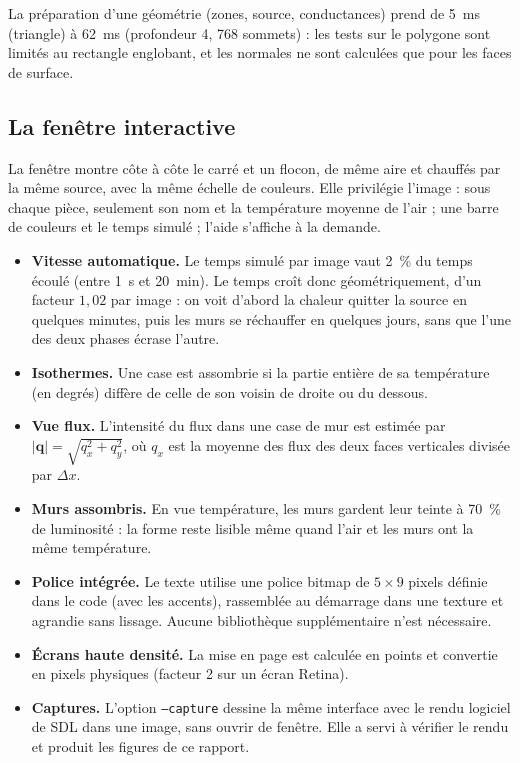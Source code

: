 \documentclass[11pt,a4paper]{article}
\theoremstyle{definition}
\theoremstyle{remark}
\newcommand{\dx}{\Delta x}
\begin{document}
La préparation d'une géométrie (zones, source, conductances) prend de
\qty{5}{\milli\second} (triangle) à \qty{62}{\milli\second} (profondeur 4, 768
sommets) : les tests sur le polygone sont limités au rectangle englobant, et les
normales ne sont calculées que pour les faces de surface.

\subsection{La fenêtre interactive}

La fenêtre montre côte à côte le carré et un flocon, de même aire et chauffés par
la même source, avec la même échelle de couleurs. Elle privilégie l'image : sous
chaque pièce, seulement son nom et la température moyenne de l'air ; une barre de
couleurs et le temps simulé ; l'aide s'affiche à la demande.

\begin{itemize}
  \item \textbf{Vitesse automatique.} Le temps simulé par image vaut \qty{2}{\percent}
  du temps écoulé (entre \qty{1}{\second} et \qty{20}{\minute}). Le temps croît donc
  géométriquement, d'un facteur $1,02$ par image : on voit d'abord la chaleur quitter
  la source en quelques minutes, puis les murs se réchauffer en quelques jours, sans
  que l'une des deux phases écrase l'autre.
  \item \textbf{Isothermes.} Une case est assombrie si la partie entière de sa
  température (en degrés) diffère de celle de son voisin de droite ou du dessous.
  \item \textbf{Vue flux.} L'intensité du flux dans une case de mur est estimée par
  $|\mathbf{q}| = \sqrt{q_x^2+q_y^2}$, où $q_x$ est la moyenne des flux des deux faces
  verticales divisée par $\dx$.
  \item \textbf{Murs assombris.} En vue température, les murs gardent leur teinte à
  \qty{70}{\percent} de luminosité : la forme reste lisible même quand l'air et les
  murs ont la même température.
  \item \textbf{Police intégrée.} Le texte utilise une police bitmap de $5\times9$
  pixels définie dans le code (avec les accents), rassemblée au démarrage dans une
  texture et agrandie sans lissage. Aucune bibliothèque supplémentaire n'est
  nécessaire.
  \item \textbf{Écrans haute densité.} La mise en page est calculée en points et
  convertie en pixels physiques (facteur 2 sur un écran Retina).
  \item \textbf{Captures.} L'option \texttt{--capture} dessine la même interface avec
  le rendu logiciel de SDL dans une image, sans ouvrir de fenêtre. Elle a servi à
  vérifier le rendu et produit les figures de ce rapport.
\end{itemize}
\end{document}
